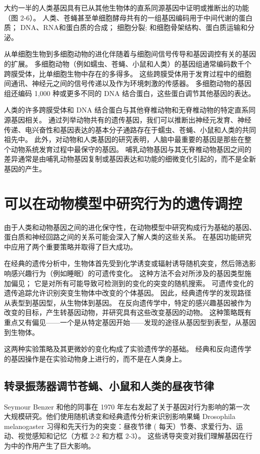 大约一半的人类基因具有已从其他生物体的直系同源基因中证明或推断出的功能（图 2-6）。 人类、苍蝇甚至单细胞酵母共有的一组基因编码用于中间代谢的蛋白质； DNA、RNA和蛋白质的合成； 细胞分裂; 和细胞骨架结构、蛋白质运输和分泌。

从单细胞生物到多细胞动物的进化伴随着与细胞间信号传导和基因调控有关的基因的扩展。 多细胞动物（例如蠕虫、苍蝇、小鼠和人类）的基因组通常编码数千个跨膜受体，比单细胞生物中存在的多得多。 这些跨膜受体用于发育过程中的细胞间通讯、神经元之间的信号传递以及作为环境刺激的传感器。 多细胞动物的基因组还编码 1,000 种或更多不同的 DNA 结合蛋白，这些蛋白调节其他基因的表达。

人类的许多跨膜受体和 DNA 结合蛋白与其他脊椎动物和无脊椎动物的特定直系同源基因相关。 通过列举动物共有的遗传基因，我们可以推断出神经元发育、神经传递、电兴奋性和基因表达的基本分子通路存在于蠕虫、苍蝇、小鼠和人类的共同祖先中。 此外，对动物和人类基因的研究表明，人脑中最重要的基因是那些在整个动物系统发育过程中最保守的基因。 哺乳动物基因与其无脊椎动物基因之间的差异通常是由哺乳动物基因复制或基因表达和功能的细微变化引起的，而不是全新基因的产生。

\section{可以在动物模型中研究行为的遗传调控}
由于人类和动物基因之间的进化保守性，在动物模型中研究构成行为基础的基因、蛋白质和神经回路之间的关系可能会深入了解人类的这些关系。 在基因功能研究中应用了两个重要策略并取得了巨大成功。

在经典的遗传分析中，生物体首先受到化学诱变或辐射诱导随机突变，然后筛选影响感兴趣行为（例如睡眠）的可遗传变化。 这种方法不会对所涉及的基因类型施加偏见； 它是对所有可能导致可检测到的变化的突变的随机搜索。 可遗传变化的遗传追踪允许识别突变生物体中改变的个体基因。 因此，经典遗传学的发现路径从表型到基因型，从生物体到基因。 在反向遗传学中，特定的感兴趣基因被作为改变的目标，产生转基因动物，并研究具有这些改变基因的动物。 这种策略既有重点又有偏见——一个是从特定基因开始——发现的途径从基因型到表型，从基因到生物体。

这两种实验策略及其更微妙的变化构成了实验遗传学的基础。 经典和反向遗传学的基因操作是在实验动物身上进行的，而不是在人类身上。

\subsection{转录振荡器调节苍蝇、小鼠和人类的昼夜节律}
Seymour Benzer 和他的同事在 1970 年左右发起了关于基因对行为影响的第一次大规模研究。他们使用随机诱变和经典遗传分析来识别影响果蝇 Drosophila melanogaster 习得和先天行为的突变：昼夜节律 ( 每天）节奏、求爱行为、运动、视觉感知和记忆（方框 2-2 和方框 2-3）。 这些诱导突变对我们理解基因在行为中的作用产生了巨大影响。

